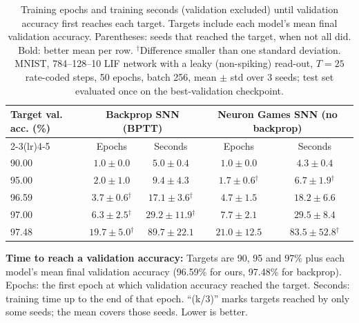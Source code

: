 \documentclass{article}
\begin{document}
\begin{table}[H]
\centering
\small
\caption{Training epochs and training seconds (validation excluded) until validation accuracy first reaches each target. Targets include each model's mean final validation accuracy. Parentheses: seeds that reached the target, when not all did. Bold: better mean per row. $^\dagger$Difference smaller than one standard deviation. MNIST, 784--128--10 LIF network with a leaky (non-spiking) read-out, $T=25$ rate-coded steps, 50 epochs, batch 256, mean $\pm$ std over 3 seeds; test set evaluated once on the best-validation checkpoint.}
\label{tab:t1-time-to-accuracy}
\begin{tabular}{lcccc}
\toprule
\multirow{2}{*}{Target val. acc. (\%)} & \multicolumn{2}{c}{Backprop SNN (BPTT)} & \multicolumn{2}{c}{Neuron Games SNN (no backprop)} \\
\cmidrule(lr){2-3}\cmidrule(lr){4-5}
 & Epochs & Seconds & Epochs & Seconds \\
\midrule
90.00 & $1.0 \pm 0.0$ & $5.0 \pm 0.4$ & $1.0 \pm 0.0$ & $\boldsymbol{4.3 \pm 0.4}$ \\
95.00 & $2.0 \pm 1.0$ & $9.4 \pm 4.3$ & $\boldsymbol{1.7 \pm 0.6}$$^\dagger$ & $\boldsymbol{6.7 \pm 1.9}$$^\dagger$ \\
96.59 & $\boldsymbol{3.7 \pm 0.6}$$^\dagger$ & $\boldsymbol{17.1 \pm 3.6}$$^\dagger$ & $4.7 \pm 1.5$ & $18.2 \pm 6.6$ \\
97.00 & $\boldsymbol{6.3 \pm 2.5}$$^\dagger$ & $\boldsymbol{29.2 \pm 11.9}$$^\dagger$ & $7.7 \pm 2.1$ & $29.5 \pm 8.4$ \\
97.48 & $\boldsymbol{19.7 \pm 5.0}$$^\dagger$ & $89.7 \pm 22.1$ & $21.0 \pm 12.5$ & $\boldsymbol{83.5 \pm 52.8}$$^\dagger$ \\
\bottomrule
\end{tabular}
\end{table}

{\small
\noindent\textbf{Time to reach a validation accuracy:} Targets are 90, 95 and 97\% plus each model's mean final
validation accuracy (96.59\% for ours, 97.48\% for backprop). Epochs: the first epoch at which validation accuracy
reached the target. Seconds: training time up to the end of that epoch. ``(k/3)'' marks targets reached by only
some seeds; the mean covers those seeds. Lower is better.
}
\end{document}
